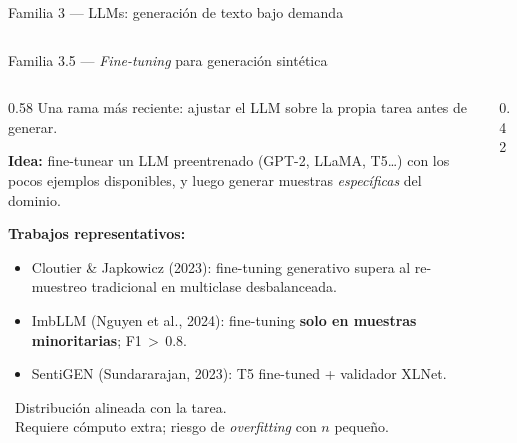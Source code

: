 \begin{frame}{Familia 3 — LLMs: generación de texto bajo demanda}
\begin{columns}[T]
\end{columns}

\end{frame}

\begin{frame}{Familia 3.5 — \textit{Fine-tuning} para generación sintética}
\begin{columns}[T]

\begin{column}{0.58\textwidth}
\small
Una rama más reciente: \alert{ajustar el LLM} sobre la propia tarea antes de generar.

\vspace{0.2em}
\textbf{Idea:} fine-tunear un LLM preentrenado (GPT-2, LLaMA, T5\dots) con los pocos ejemplos disponibles, y luego generar muestras \emph{específicas} del dominio.

\vspace{0.3em}
\textbf{Trabajos representativos:}
\begin{itemize}\setlength\itemsep{0pt}\scriptsize
  \item Cloutier \& Japkowicz (2023): \alert{fine-tuning generativo} supera al re-muestreo tradicional en multiclase desbalanceada.
  \item ImbLLM (Nguyen et al., 2024): fine-tuning \textbf{solo en muestras minoritarias}; F1\,$>$\,0.8.
  \item SentiGEN (Sundararajan, 2023): T5 fine-tuned + validador XLNet.
\end{itemize}

\vspace{0.3em}
{\scriptsize
\good\ Distribución alineada con la tarea.\\
\bad\ Requiere \alert{cómputo extra}; riesgo de \emph{overfitting} con $n$ pequeño.}
\end{column}

\begin{column}{0.42\textwidth}
\centering
\vspace{0.1em}
\end{column}
\end{columns}
\end{frame}
